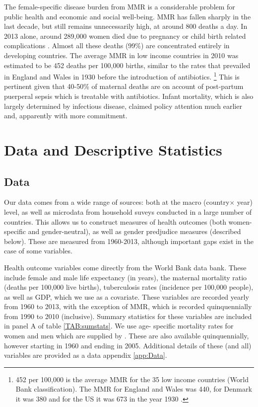\documentclass[11pt]{article}
\begin{document}
\begin{spacing}{1.4}
The female-specific disease burden from MMR is a considerable problem for public 
health and economic and social well-being.  MMR has fallen sharply in the last 
decade, but still remains unnecessarily high, at around 800 deaths a day. In 2013 
alone, around 289,000 women died due to pregnancy or child birth related 
complications \citep{WHO2014}. Almost all these deaths (99\%) are concentrated 
entirely in developing countries. The average MMR in low income countries in 2010 
was estimated to be 452 deaths per 100,000 births, similar to the rates that 
prevailed in England and Wales in 1930 before the introduction of antibiotics.%
\footnote{452 per 100,000 is the average MMR for the 35 low income countries 
(World Bank classification). The MMR for England and Wales was 440, for Denmark 
it was 380 and for the US it was 673 in the year 1930 \citep{loudon1992death}.} 
This is pertinent given that 40-50\% of maternal deaths are on account of 
post-partum puerperal sepsis which is treatable with antibiotics. Infant 
mortality, which is also largely determined by infectious disease, claimed policy 
attention much earlier and, apparently with more commitment. 



\section{Data and Descriptive Statistics}
\subsection{Data}
\label{scn:data}
Our data comes from a wide range of sources: both at the macro (country$\times$%
year) level, as well as microdata from household suveys conducted in a large
number of countries.  This allows us to construct measures of health outcomes
(both women-specific and gender-neutral), as well as gender predjudice measures
(described below).  These are measured from 1960-2013, although important gaps
exist in the case of some variables.

Health outcome variables come directly from the World Bank data bank. These 
include female and male life expectancy (in years), the maternal mortality ratio 
(deaths per 100,000 live births), tuberculosis rates (incidence per 100,000 
people), as well as GDP, which we use as a covariate.  These variables are 
recorded yearly from 1960 to 2013, with the exception of MMR, which is recorded 
quinquennially from 1990 to 2010 (inclusive).  Summary statistics for these 
variables are included in panel A of table \ref{TAB:sumstats}.  We use age-%
specific mortality rates for women and men which are supplied by 
\citet{UNMortality2012}.  These are also available quinquennially, however 
starting in 1960 and ending in 2005.  Additional details of these (and all) 
variables are provided as a data appendix \ref{app:Data}.


\end{spacing}
\end{document}
